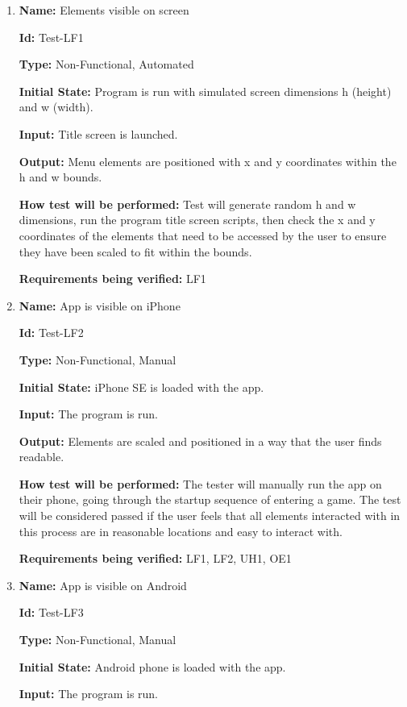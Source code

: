 \documentclass[12pt, titlepage]{article}
\begin{document}
\begin{enumerate}

\item{\textbf{Name:} Elements visible on screen}

\textbf{Id:} Test-LF1

\textbf{Type:} Non-Functional, Automated
					
\textbf{Initial State:} Program is run with simulated screen dimensions h (height) and w (width).
					
\textbf{Input:} Title screen is launched.
					
\textbf{Output:} Menu elements are positioned with x and y coordinates within the h and w bounds. 
					
\textbf{How test will be performed:} Test will generate random h and w dimensions, run the program title screen scripts, then check the x and y coordinates of the elements that need to be accessed by the user to ensure they have been scaled to fit within the bounds. 

\textbf{Requirements being verified:} LF1

\item{\textbf{Name:} App is visible on iPhone}

\textbf{Id:} Test-LF2

\textbf{Type:} Non-Functional, Manual
					
\textbf{Initial State:} iPhone SE is loaded with the app.
					
\textbf{Input:} The program is run. 
					
\textbf{Output:} Elements are scaled and positioned in a way that the user finds readable. 
					
\textbf{How test will be performed:} The tester will manually run the app on their phone, going through the startup sequence of entering a game. The test will be considered passed if the user feels that all elements interacted with in this process are in reasonable locations and easy to interact with.

\textbf{Requirements being verified:} LF1, LF2, UH1, OE1

\item{\textbf{Name:} App is visible on Android}

\textbf{Id:} Test-LF3

\textbf{Type:} Non-Functional, Manual
					
\textbf{Initial State:} Android phone is loaded with the app.
					
\textbf{Input:} The program is run. 
					

\end{enumerate}
\end{document}
